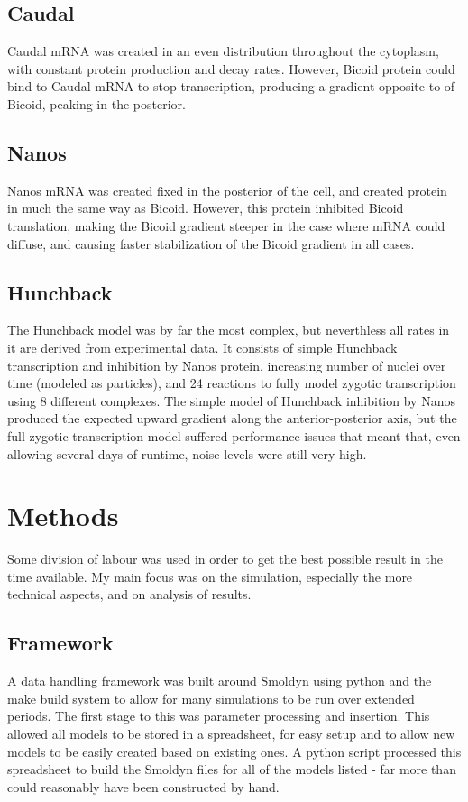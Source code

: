 \documentclass[11pt,a4paper,twocolumn]{article}
\begin{document}
\subsection{Caudal}
Caudal mRNA was created in an even distribution throughout the cytoplasm, with constant protein production and decay rates. However, Bicoid protein could bind to Caudal mRNA to stop transcription, producing a gradient opposite to of Bicoid, peaking in the posterior.

\subsection{Nanos}
Nanos mRNA was created fixed in the posterior of the cell, and created protein in much the same way as Bicoid. However, this protein inhibited Bicoid translation, making the Bicoid gradient steeper in the case where mRNA could diffuse, and causing faster stabilization of the Bicoid gradient in all cases.

\subsection{Hunchback}
The Hunchback model was by far the most complex, but neverthless all rates in it are derived from experimental data. It consists of simple Hunchback transcription and inhibition by Nanos protein, increasing number of nuclei over time (modeled as particles), and 24 reactions to fully model zygotic transcription using 8 different complexes. The simple model of Hunchback inhibition by Nanos produced the expected upward gradient along the anterior-posterior axis, but the full zygotic transcription model suffered performance issues that meant that, even allowing several days of runtime, noise levels were still very high.

\section{Methods}
Some division of labour was used in order to get the best possible result in the time available. My main focus was on the simulation, especially the more technical aspects, and on analysis of results.

\subsection{Framework}
A data handling framework was built around Smoldyn using python and the make build system to allow for many simulations to be run over extended periods. The first stage to this was parameter processing and insertion. This allowed all models to be stored in a spreadsheet, for easy setup and to allow new models to be easily created based on existing ones. A python script processed this spreadsheet to build the Smoldyn files for all of the models listed - far more than could reasonably have been constructed by hand. 
\end{document}
